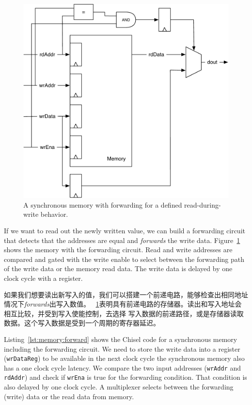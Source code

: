 \documentclass[%
    10pt,
    headinclude, footexclude,
    openright, %
    notitlepage,
    cleardoubleempty,
    headsepline,
    pointlessnumbers,
    bibtotoc, idxtotoc,
    ]{scrbook}
\newcommand{\code}[1]{{\small{\texttt{#1}}}}
\newcommand{\scale}{0.7}
\begin{document}
\begin{figure}
  \centering
  \includegraphics[scale=\scale]{figures/memory-forwarding}
  \caption{A synchronous memory with forwarding for a defined read-during-write behavior.}
  \label{fig:memory:forwarding}
\end{figure}

If we want to read out the newly written value, we can build a forwarding
circuit that detects that the addresses are equal and \emph{forwards} the
write data. Figure~\ref{fig:memory:forwarding} shows the memory with
the forwarding circuit. Read and write addresses are compared and gated with
the write enable to select between the forwarding path of the write data or the
memory read data. The write data is delayed by one clock cycle with a register.

如果我们想要读出新写入的值，我们可以搭建一个前递电路，能够检查出相同地址情况下\emph{forwards}出写入数值。
~\ref{fig:memory:forwarding}表明具有前递电路的存储器。读出和写入地址会相互比较，并受到写入使能控制，去选择
写入数据的前递路径，或是存储器读取数据。这个写入数据是受到一个周期的寄存器延迟。

Listing~\ref{lst:memory:forward} shows the Chisel code for a synchronous memory
including the forwarding circuit. We need to store the write data into a register
(\code{wrDataReg}) to be available in the next clock cycle the synchronous
memory also has a one clock cycle latency.
We compare the two input addresses (\code{wrAddr} and \code{rdAddr})
and check if \code{wrEna} is true for the forwarding condition.
That condition is also delayed by one clock cycle.
A multiplexer selects between the forwarding (write) data or the read
data from memory.
\end{document}
